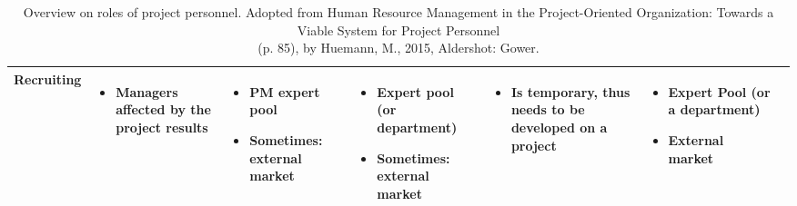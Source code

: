 \begin{table}
\begin{tabularx}{22cm}{X X X X X X r}
        \textbf{Recruiting} & 
        \begin{itemize} [noitemsep,topsep=0pt, leftmargin=0pt]
            \item Managers affected by the project results 
        \end{itemize} & 
        \begin{itemize} [noitemsep,topsep=0pt, leftmargin=0pt]
            \item PM expert pool 
            \item Sometimes: external market 
        \end{itemize} & 
        \begin{itemize} [noitemsep,topsep=0pt, leftmargin=0pt]
            \item Expert pool (or department)
            \item Sometimes: external market 
        \end{itemize} & 
        \begin{itemize} [noitemsep,topsep=0pt, leftmargin=0pt]
            \item Is temporary, thus needs to be developed on a project
        \end{itemize} & 
        \begin{itemize} [noitemsep,topsep=0pt, leftmargin=0pt]
            \item Expert Pool (or a department) 
            \item External market 
        \end{itemize} &
         \\    

    \bottomrule 
    \end{tabularx}
    
    \caption[Overview on roles of project personnel]{Overview on roles of project personnel. Adopted from Human Resource Management in the Project-Oriented Organization: Towards a Viable System for Project Personnel \\ (p. 85), by Huemann, M., 2015, Aldershot: Gower.}
    \label{tab:roles}
\end{table}


